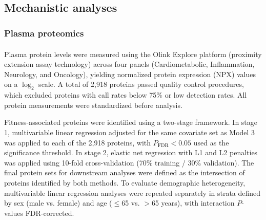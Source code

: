 \documentclass{article}
\begin{document}
\subsection*{Mechanistic analyses}

\subsubsection*{Plasma proteomics}

Plasma protein levels were measured using the Olink\textsuperscript{\textregistered} Explore platform (proximity extension assay technology) across four panels (Cardiometabolic, Inflammation, Neurology, and Oncology), yielding normalized protein expression (NPX) values on a $\log_2$ scale. A total of 2,918 proteins passed quality control procedures, which excluded proteins with call rates below 75\% or low detection rates. All protein measurements were standardized before analysis.

Fitness-associated proteins were identified using a two-stage framework. In stage 1, multivariable linear regression adjusted for the same covariate set as Model 3 was applied to each of the 2,918 proteins, with $P_{\text{FDR}}<0.05$ used as the significance threshold. In stage 2, elastic net regression with L1 and L2 penalties was applied using 10-fold cross-validation (70\% training / 30\% validation). The final protein sets for downstream analyses were defined as the intersection of proteins identified by both methods. To evaluate demographic heterogeneity, multivariable linear regression analyses were repeated separately in strata defined by sex (male vs. female) and age ($\leq$65 vs. $>$65 years), with interaction $P$-values FDR-corrected.
\end{document}
